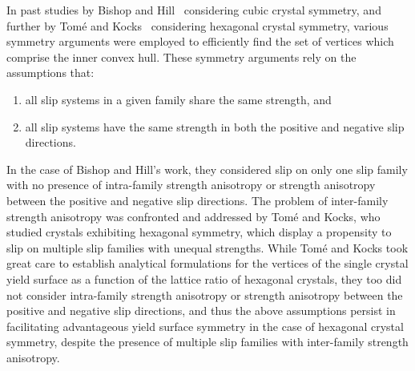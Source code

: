 \documentclass[preprint,3p,times,sort&compress,letterpaper,12pt]{elsarticle} %
\begin{document}
In past studies by Bishop and Hill~\cite{Bishop1951} considering cubic crystal symmetry, and further by Tom{\'e} and Kocks~\cite{Tome1985} considering hexagonal crystal symmetry, various symmetry arguments were employed to efficiently find the set of vertices which comprise the inner convex hull. These symmetry arguments rely on the assumptions that:
\begin{enumerate}
    \item all slip systems in a given family share the same strength, and
    \item all slip systems have the same strength in both the positive and negative slip directions.
\end{enumerate}
In the case of Bishop and Hill's work, they considered slip on only one slip family with no presence of intra-family strength anisotropy or strength anisotropy between the positive and negative slip directions. The problem of inter-family strength anisotropy was confronted and addressed by Tom{\'e} and Kocks, who studied crystals exhibiting hexagonal symmetry, which display a propensity to slip on multiple slip families with unequal strengths. While Tom{\'e} and Kocks took great care to establish analytical formulations for the vertices of the single crystal yield surface as a function of the lattice ratio of hexagonal crystals, they too did not consider intra-family strength anisotropy or strength anisotropy between the positive and negative slip directions, and thus the above assumptions persist in facilitating advantageous yield surface symmetry in the case of hexagonal crystal symmetry, despite the presence of multiple slip families with inter-family strength anisotropy. 
\end{document}
